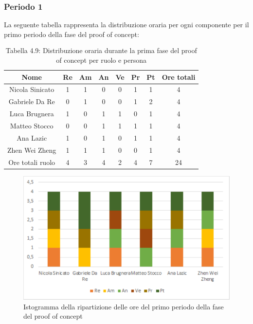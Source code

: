\subsubsection{Periodo 1}
%
La seguente tabella rappresenta la distribuzione oraria per ogni componente per il primo periodo della fase del proof of concept:
\begin{table}[h]
	\setlength\extrarowheight{5pt}
	\centering
	\begin{tabularx}{\textwidth}{|ccccccc|c|}
		\hline
		\rowcolor{white}
		\textbf{Nome} & \textbf{Re} & \textbf{Am} & \textbf{An} & \textbf{Ve} & \textbf{Pr}& \textbf{Pt} & \textbf{Ore totali} \\
		\hline
		Nicola Sinicato &1&1&0&0&1&1&4 \\
		Gabriele Da Re &0&1&0&0&1&2&4 \\
		Luca Brugnera &1&0&1&1&0&1&4 \\
		Matteo Stocco &0&0&1&1&1&1&4 \\
		Ana Lazic &1&0&1&0&1&1&4 \\
		Zhen Wei Zheng &1&1&1&0&0&1&4 \\
		\hline
		Ore totali ruolo &4&3&4&2&4&7&24 \\
		\hline
	\end{tabularx}
	\vspace{10pt}
	\caption{Tabella 4.9: Distribuzione oraria durante la prima fase del proof of concept per ruolo e persona}
\end{table}
\begin{figure}[H]
    \centering
    \includegraphics[scale=0.6]{img/grafi preventivo/istogrammi/proof/periodo1.png}
    \caption{Istogramma della ripartizione delle ore del primo periodo della fase del proof of concept}
\end{figure}
